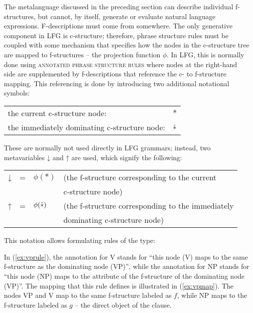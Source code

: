 \documentclass[output=paper,hidelinks]{langscibook}
\begin{document}
 The metalanguage discussed in the preceding section can describe individual f-structures, but cannot, by itself,  generate or evaluate natural language expressions. F-descriptions must come from somewhere. The only generative component in LFG is c-structure; therefore, phrase structure rules must be coupled with some mechanism that specifies how the nodes in the c-structure tree are mapped to f-structures -- the projection function $\phi$. In LFG, this is normally done using \textsc{annotated phrase structure rules} where nodes at the right-hand side are supplemented by f-descriptions that reference the c- to f-structure mapping. This referencing is done by introducing two additional notational symbols:

\eas
 \begin{tabular}[t]{ll}
  the current c-structure node: & $*$\\
  the immediately dominating c-structure node: & $\hbox{$\hat{\ast}$}$\\
 \end{tabular}
 \zs
These are normally not used directly in LFG grammars; instead, two metavariables ↓ and ↑ are used, which signify the following:
 
   \eas
 \begin{tabular}[t]{llll}
  ↓ & = & $\phi(*)$ & (the f-structure corresponding to the current \\
  & & & c-structure node)\\
  ↑ & = & $\phi(\hbox{$\hat{\ast}$})$ & (the f-structure corresponding to the immediately \\
  & & & dominating c-structure node)\\
 \end{tabular}
 \zs
This notation allows formulating rules of the type:
 
 \ea\label{ex:vprule}
 \z
In (\ref{ex:vprule}), the annotation for V stands for ``this node (V) maps to the same f-structure as the dominating node (VP)'', while the annotation for NP stands for ``this node (NP) maps to the \OBJ attribute of the f-structure of the dominating node (VP)''. The mapping that this rule defines is illustrated in (\ref{ex:vpmap}). The nodes VP and V map to the same f-structure labeled as $f$, while NP maps to the f-structure labeled as $g$ -- the direct object of the clause.
 
\end{document}
